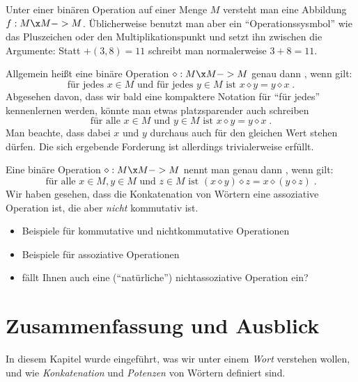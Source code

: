 Unter einer binären Operation auf einer Menge $M$ versteht man eine
Abbildung $f:M\x M->M$. Üblicherweise benutzt man aber ein
"`Operationssysmbol"' wie das Pluszeichen oder den
Multiplikationspunkt und setzt ihn zwischen die Argumente: Statt
$+(3,8)=11$ schreibt man normalerweise $3+8=11$.

Allgemein heißt eine binäre Operation $\diamond:M\x M->M$ genau dann
, wenn gilt:
%
\[
  \text{für jedes } x\in M \text{ und für jedes } y\in M \text{ ist }
  x \diamond y = y \diamond x \;.
\]
%
Abgesehen davon, dass wir bald eine kompaktere Notation für "`für
jedes"' kennenlernen werden, könnte man etwas platzsparender auch
schreiben
\[
  \text{für alle } x\in M \text{ und } y\in M \text{ ist }
  x \diamond y = y \diamond x \;.
\]
%
Man beachte, dass dabei $x$ und $y$ durchaus auch für den gleichen
Wert stehen dürfen.
%
Die sich ergebende Forderung ist allerdings trivialerweise erfüllt.

Eine binäre Operation $\diamond:M\x M->M$ nennt man genau dann
, wenn gilt:
%
\[
  \text{für alle } x\in M, y\in M \text{ und } z\in M \text{ ist }
  (x \diamond y) \diamond z = x \diamond(y \diamond z) \;.
\]
%
Wir haben gesehen, dass die Konkatenation von Wörtern eine assoziative
Operation ist, die aber \emph{nicht} kommutativ ist.

\begin{tutorium}
  \begin{itemize}
  \item Beispiele für kommutative und nichtkommutative Operationen
  \item Beispiele für assoziative Operationen
  \item fällt Ihnen auch eine ("`natürliche"') nichtassoziative
    Operation ein?
  \end{itemize}
\end{tutorium}
\section*{Zusammenfassung und Ausblick}

In diesem Kapitel wurde eingeführt, was wir unter einem \emph{Wort}
verstehen wollen, und wie \emph{Konkatenation} und \emph{Potenzen} von
Wörtern definiert sind.

